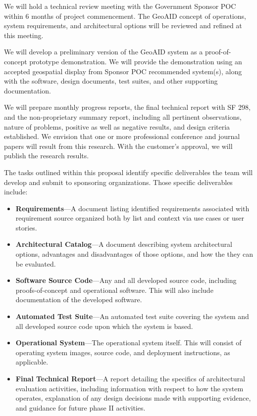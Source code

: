 \documentclass{sbir}
\begin{document}
We will hold a technical review meeting with the Government Sponsor POC within 6 months of project commencement. The GeoAID concept of operations, system requirements, and architectural options will be reviewed and refined at this meeting.

We will develop a preliminary version of the GeoAID system as a proof-of-concept prototype demonstration. We will provide the demonstration using an accepted geospatial display from Sponsor POC recommended system(s), along with the software, design documents, test suites, and other supporting documentation.

We will prepare monthly progress reports, the final technical report with SF 298, and the non-proprietary summary report, including all pertinent observations, nature of problems, positive as well as negative results, and design criteria established. We envision that one or more professional conference and journal papers will result from this research. With the customer's approval, we will publish the research results.

The tasks outlined within this proposal identify specific deliverables the team will develop and submit to sponsoring organizations. Those specific deliverables include:
\vspace{-0.1in}
\begin{itemize}
\item {\bf Requirements}---A document listing identified requirements associated with requirement source organized both by list and context via use cases or user stories.
\item {\bf Architectural Catalog}---A document describing system architectural options, advantages and disadvantages of those options, and how the they can be evaluated.
\item {\bf Software Source Code}---Any and all developed source code, including proofs-of-concept and operational software. This will also include documentation of the developed software.
\item {\bf Automated Test Suite}---An automated test suite covering the system and all developed source code upon which the system is based.
\item {\bf Operational System}---The operational system itself. This will consist of operating system images, source code, and deployment instructions, as applicable.
\item {\bf Final Technical Report}---A report detailing the specifics of architectural evaluation activities, including information with respect to how the system operates, explanation of any design decisions made with supporting evidence, and guidance for future phase II activities.
\end{itemize}
\end{document}
